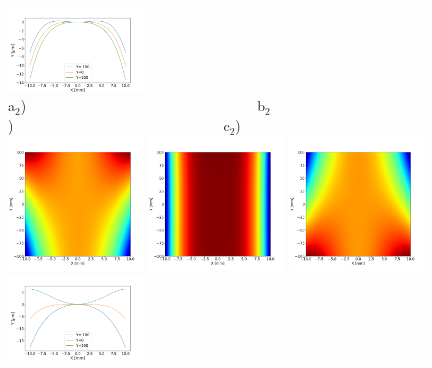 \documentclass{iucr}              %
\begin{document}
\begin{figure}
\includegraphics[width=0.32\textwidth]{figures/diaboloid_detrended_1:1_profile.png} \\
\flushleft
a$_2$)~~~~~~~~~~~~~~~~~~~~~~~~~~~~~~~~~b$_2$)~~~~~~~~~~~~~~~~~~~~~~~~~~~~~~c$_2$)\\
\centering
\includegraphics[width=0.32\textwidth]{figures/diaboloid_detrended_5mrad_1:5_image.png} 
\includegraphics[width=0.32\textwidth]{figures/diaboloid_detrended_5mrad_1:2_image.png} 
\includegraphics[width=0.32\textwidth]{figures/diaboloid_detrended_5mrad_1:1_image.png} \\
\includegraphics[width=0.32\textwidth]{figures/diaboloid_detrended_5mrad_1:5_profile.png}

\end{figure}
\end{document}
